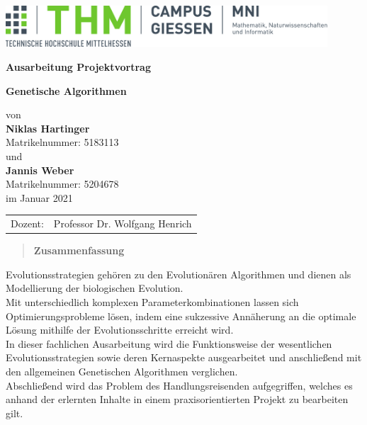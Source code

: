 \documentclass[%
	BCOR=8.25mm,         %
	DIV=12,              %
	parskip=half,				 %
	bibliography=totoc,	 %
	headsepline=on,      %
	cleardoublepage=plain %
	]{scrartcl}
\begin{document}

\begin{titlepage}
	\begin{center}
	\includegraphics[width=0.9\textwidth]{img/mni-logo}
	
	\vspace{3cm}	

	\huge\textbf{\sffamily Ausarbeitung Projektvortrag}

	\vspace{1cm}	

	\Huge\textbf{\sffamily Genetische Algorithmen}

	\normalsize
	\vspace{1cm}

	von \\[1cm]	

	\Huge\textbf{Niklas Hartinger}\\ [.5cm]\normalsize
	Matrikelnummer: 5183113\\ [.75cm]
	
	und \\[1cm]	
	
	\LARGE\textbf{Jannis Weber}\\ [.5cm]\normalsize
	Matrikelnummer: 5204678\\ [.75cm]
	
	im Januar 2021
	\end{center}
	\vfill
	\begin{tabular}{ll}
		Dozent: & Professor Dr. Wolfgang Henrich 
	\end{tabular}
\end{titlepage}

\pagestyle{entrypage}
\setcounter{page}{1}
\begin{quote}
	\vspace*{4cm}

	\begin{center}
		\textbf{\Large\sffamily Zusammenfassung}
	\end{center}
	\vspace*{.5cm}
	
\end{quote}

	Evolutionsstrategien gehören zu den Evolutionären Algorithmen und dienen als Modellierung der biologischen Evolution.\\
	Mit unterschiedlich komplexen Parameterkombinationen lassen sich Optimierungsprobleme lösen, indem eine sukzessive Annäherung an die optimale Lösung mithilfe der Evolutionsschritte erreicht wird.\\
	In dieser fachlichen Ausarbeitung wird die Funktionsweise der wesentlichen Evolutionsstrategien sowie deren Kernaspekte ausgearbeitet und anschließend mit den allgemeinen Genetischen Algorithmen verglichen.\\
	Abschließend wird das Problem des Handlungsreisenden aufgegriffen, welches es anhand der erlernten Inhalte in einem praxisorientierten Projekt zu bearbeiten gilt.
	
\end{document}

